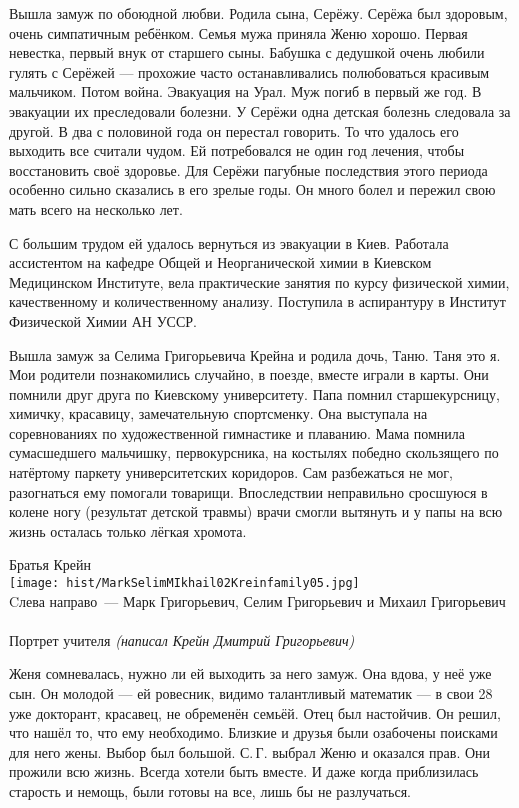 Вышла замуж по обоюдной любви. Родила сына, Серёжу. Серёжа был здоровым, очень симпатичным ребёнком. Семья мужа приняла Женю хорошо. Первая невестка, первый внук от старшего сыны. Бабушка с дедушкой очень любили гулять с Серёжей --- прохожие часто останавливались полюбоваться красивым мальчиком. Потом война. Эвакуация на Урал. Муж погиб в первый же год. В эвакуации их преследовали болезни. У Серёжи одна детская болезнь следовала за другой. В два с половиной года он перестал говорить. То что удалось его выходить все считали чудом. Ей потребовался не один год лечения, чтобы восстановить своё здоровье. Для Серёжи пагубные последствия этого периода особенно сильно сказались в его зрелые годы. Он много болел и пережил свою мать всего на несколько лет.

С большим трудом ей удалось вернуться из эвакуации в Киев. Работала ассистентом на кафедре Общей и Неорганической химии в Киевском Медицинском Институте, вела практические занятия по курсу физической химии, качественному и количественному анализу. Поступила в аспирантуру в Институт Физической Химии АН УССР.

Вышла замуж за Селима Григорьевича Крейна и родила дочь, Таню. Таня это я. Мои родители познакомились случайно, в поезде, вместе играли в карты. Они помнили друг друга по Киевскому университету. Папа помнил старшекурсницу, химичку, красавицу, замечательную спортсменку. Она выступала на соревнованиях по художественной гимнастике и плаванию. Мама помнила сумасшедшего мальчишку, первокурсника, на костылях победно скользящего по натёртому паркету университетских коридоров. Сам разбежаться не мог, разогнаться ему помогали товарищи. Впоследствии неправильно сросшуюся в колене ногу (результат детской травмы) врачи смогли вытянуть и у папы на всю жизнь осталась только лёгкая хромота.

\begin{center}
{\centering
Братья Крейн
\\
{\texttt{[image: hist/MarkSelimMIkhail02Kreinfamily05.jpg]}}
\\
Cлева направо~--- Марк Григорьевич, Селим Григорьевич и Михаил Григорьевич
\\
{}
\\
Портрет учителя \textit{(написал Крейн Дмитрий Григорьевич)}
}
\end{center}



Женя сомневалась, нужно ли ей выходить за него замуж. Она вдова, у неё уже сын. Он молодой --- ей ровесник, видимо талантливый математик --- в свои 28 уже докторант, красавец, не обременён семьёй. Отец был настойчив. Он решил, что нашёл то, что ему необходимо. Близкие и друзья были озабочены поисками для него жены. Выбор был большой. С.\,Г. выбрал Женю и оказался прав. Они прожили всю жизнь. Всегда хотели быть вместе. И даже когда приблизилась старость и немощь, были готовы на все, лишь бы не разлучаться.

